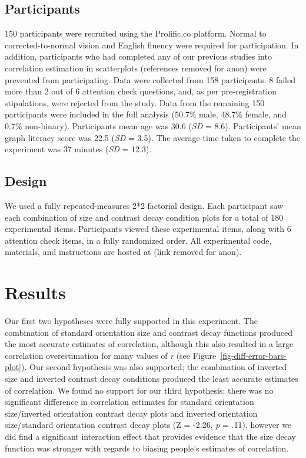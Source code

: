 \documentclass[manuscript, review, anonymous, screen]{acmart}
\begin{document}
\hypertarget{sec-participants}{%
\subsection{Participants}\label{sec-participants}}

150 participants were recruited using the Prolific.co platform. Normal
to corrected-to-normal vision and English fluency were required for
participation. In addition, participants who had completed any of our
previous studies into correlation estimation in scatterplots (references
removed for anon) were prevented from participating. Data were collected
from 158 participants. 8 failed more than 2 out of 6 attention check
questions, and, as per pre-registration stipulations, were rejected from
the study. Data from the remaining 150 participants were included in the
full analysis (50.7\% male, 48.7\% female, and 0.7\% non-binary).
Participants mean age was 30.6 (\emph{SD} = 8.6). Participants' mean
graph literacy score was 22.5 (\emph{SD} = 3.5). The average time taken
to complete the experiment was 37 minutes (\emph{SD} = 12.3).

\hypertarget{sec-design}{%
\subsection{Design}\label{sec-design}}

We used a fully repeated-measures 2*2 factorial design. Each participant
saw each combination of size and contrast decay condition plots for a
total of 180 experimental items. Participants viewed these experimental
items, along with 6 attention check items, in a fully randomized order.
All experimental code, materials, and instructions are hosted at (link
removed for anon).

\hypertarget{sec-results}{%
\section{Results}\label{sec-results}}

Our first two hypotheses were fully supported in this experiment. The
combination of standard orientation size and contrast decay functions
produced the most accurate estimates of correlation, although this also
resulted in a large correlation overestimation for many values of
\emph{r} (see Figure~\ref{fig-diff-error-bars-plot}). Our second
hypothesis was also supported; the combination of inverted size and
inverted contrast decay conditions produced the least accurate estimates
of correlation. We found no support for our third hypothesis; there was
no significant difference in correlation estimates for standard
orientation size/inverted orientation contrast decay plots and inverted
orientation size/standard orientation contrast decay plots (Z = -2.26,
\emph{p} = .11), however we did find a significant interaction effect
that provides evidence that the size decay function was stronger with
regards to biasing people's estimates of correlation.
\end{document}
